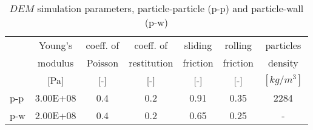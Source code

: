 \begin{table}[htbp]
  \centering
  \caption{$DEM$ simulation parameters, particle-particle (p-p) and
  particle-wall (p-w)}
    \begin{tabular}{l|cccccc}
    \hline
          & Young's & coeff. of & coeff. of & sliding & rolling & particles \\
          & modulus & Poisson & restitution & friction &
          friction & density \\
          & [Pa] &  [-] &  [-] &   [-] &  [-] &  $[kg/m^3]$  \\
          \hline
    p-p & 3.00E+08 & 0.4   & 0.2   & 0.91  & 0.35  & 2284 \\
    p-w & 2.00E+08 & 0.4   & 0.2   & 0.65  & 0.25  & - \\
    \hline
    \end{tabular}%
  \label{tab:parameters}%
\end{table}%
